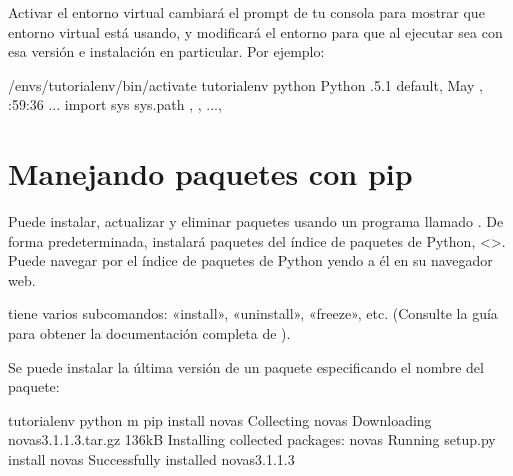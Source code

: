 \documentclass[a5paper,10pt,spanish]{sphinxmanual}
\begin{document}
\sphinxAtStartPar
Activar el entorno virtual cambiará el prompt de tu consola para mostrar que entorno virtual está usando, y modificará el entorno para que al ejecutar  sea con esa versión e instalación en particular.  Por ejemplo:

\begin{sphinxVerbatim}[commandchars=\\\{\}]
\PYGZdl{}  \PYGZti{}/envs/tutorial\PYGZhy{}env/bin/activate
tutorial\PYGZhy{}env \PYGZdl{} python
Python .5.1 default, May   , :59:36
  ...
\PYGZgt{}\PYGZgt{}\PYGZgt{} import sys
\PYGZgt{}\PYGZgt{}\PYGZgt{} sys.path
\PYG{o}{[}, , ...,
\PYG{o}{]}
\PYGZgt{}\PYGZgt{}\PYGZgt{}
\end{sphinxVerbatim}


\section{Manejando paquetes con pip}
\label{\detokenize{tutorial/venv:managing-packages-with-pip}}
\sphinxAtStartPar
Puede instalar, actualizar y eliminar paquetes usando un programa llamado . De forma predeterminada,  instalará paquetes del índice de paquetes de Python, <>. Puede navegar por el índice de paquetes de Python yendo a él en su navegador web.

\sphinxAtStartPar
{} tiene varios subcomandos: «install», «uninstall», «freeze», etc. (Consulte la guía  para obtener la documentación completa de ).

\sphinxAtStartPar
Se puede instalar la última versión de un paquete especificando el nombre del paquete:

\begin{sphinxVerbatim}[commandchars=\\\{\}]
tutorial\PYGZhy{}env \PYGZdl{} python \PYGZhy{}m pip install novas
Collecting novas
  Downloading novas\PYGZhy{}3.1.1.3.tar.gz 136kB
Installing collected packages: novas
  Running setup.py install  novas
Successfully installed novas\PYGZhy{}3.1.1.3
\end{sphinxVerbatim}
\end{document}
